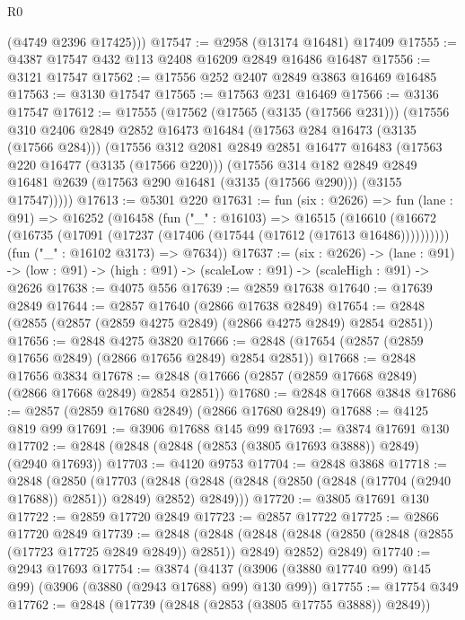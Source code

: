 \begin{lexlean}{R0}
\begin{coremodule}
        (@4749 @2396 @17425)))
@17547 := @2958 (@13174 @16481) @17409
@17555 := @4387 @17547 @432 @113 @2408 @16209 @2849 @16486 @16487
@17556 := @3121 @17547
@17562 := @17556 @252 @2407 @2849 @3863 @16469 @16485
@17563 := @3130 @17547
@17565 := @17563 @231 @16469
@17566 := @3136 @17547
@17612 := @17555
    (@17562
      (@17565 (@3135 (@17566 @231)))
      (@17556
        @310
        @2406
        @2849
        @2852
        @16473
        @16484
        (@17563 @284 @16473 (@3135 (@17566 @284)))
        (@17556
          @312
          @2081
          @2849
          @2851
          @16477
          @16483
          (@17563 @220 @16477 (@3135 (@17566 @220)))
          (@17556
            @314
            @182
            @2849
            @2849
            @16481
            @2639
            (@17563 @290 @16481 (@3135 (@17566 @290)))
            (@3155 @17547)))))
@17613 := @5301 @220
@17631 := fun (six : @2626) =>
  fun (lane : @91) =>
  @16252
    (@16458
      (fun ("_" : @16103) =>
      @16515
        (@16610 (@16672 (@16735 (@17091 (@17237 (@17406 (@17544 (@17612 (@17613 @16486))))))))))
      (fun ("_" : @16102 @3173) => @7634))
@17637 := (six : @2626) ->
  (lane : @91) -> (low : @91) -> (high : @91) -> (scaleLow : @91) -> (scaleHigh : @91) -> @2626
@17638 := @4075 @556
@17639 := @2859 @17638
@17640 := @17639 @2849
@17644 := @2857 @17640 (@2866 @17638 @2849)
@17654 := @2848 (@2855 (@2857 (@2859 @4275 @2849) (@2866 @4275 @2849) @2854 @2851))
@17656 := @2848 @4275 @3820
@17666 := @2848 (@17654 (@2857 (@2859 @17656 @2849) (@2866 @17656 @2849) @2854 @2851))
@17668 := @2848 @17656 @3834
@17678 := @2848 (@17666 (@2857 (@2859 @17668 @2849) (@2866 @17668 @2849) @2854 @2851))
@17680 := @2848 @17668 @3848
@17686 := @2857 (@2859 @17680 @2849) (@2866 @17680 @2849)
@17688 := @4125 @819 @99
@17691 := @3906 @17688 @145 @99
@17693 := @3874 @17691 @130
@17702 := @2848 (@2848 (@2848 (@2853 (@3805 @17693 @3888)) @2849) (@2940 @17693))
@17703 := @4120 @9753
@17704 := @2848 @3868
@17718 := @2848
    (@2850
      (@17703
        (@2848 (@2848 (@2848 (@2850 (@2848 (@17704 (@2940 @17688)) @2851)) @2849) @2852) @2849)))
@17720 := @3805 @17691 @130
@17722 := @2859 @17720 @2849
@17723 := @2857 @17722
@17725 := @2866 @17720 @2849
@17739 := @2848
    (@2848
      (@2848 (@2848 (@2850 (@2848 (@2855 (@17723 @17725 @2849 @2849)) @2851)) @2849) @2852)
      @2849)
@17740 := @2943 @17693
@17754 := @3874
    (@4137 (@3906 (@3880 @17740 @99) @145 @99) (@3906 (@3880 (@2943 @17688) @99) @130 @99))
@17755 := @17754 @349
@17762 := @2848 (@17739 (@2848 (@2853 (@3805 @17755 @3888)) @2849))

\end{coremodule}
\end{lexlean}
